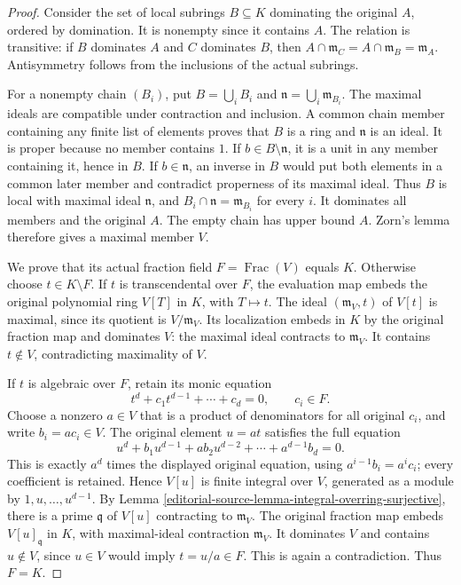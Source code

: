 \begin{proof}
Consider the set of local subrings
$B\subseteq K$ dominating the
original $A$, ordered by domination.
It is nonempty since it contains
$A$. The relation is transitive:
if $B$ dominates $A$ and $C$
dominates $B$, then
$A\cap\mathfrak m_C=A\cap\mathfrak m_B=\mathfrak m_A$.
Antisymmetry follows from the
inclusions of the actual subrings.

For a nonempty chain $(B_i)$,
put $B=\bigcup_i B_i$ and
$\mathfrak n=\bigcup_i\mathfrak m_{B_i}$.
The maximal ideals are compatible
under contraction and inclusion.
A common chain member containing
any finite list of elements proves
that $B$ is a ring and
$\mathfrak n$ is an ideal.
It is proper because no member
contains $1$. If $b\in B\setminus\mathfrak n$,
it is a unit in any member
containing it, hence in $B$.
If $b\in\mathfrak n$, an inverse
in $B$ would put both elements
in a common later member and
contradict properness of its
maximal ideal. Thus $B$ is
local with maximal ideal
$\mathfrak n$, and
$B_i\cap\mathfrak n=\mathfrak m_{B_i}$
for every $i$. It dominates
all members and the original
$A$. The empty chain has
upper bound $A$. Zorn's lemma
therefore gives a maximal
member $V$.

We prove that its actual
fraction field $F=\operatorname{Frac}(V)$
equals $K$. Otherwise choose
$t\in K\setminus F$.
If $t$ is transcendental over
$F$, the evaluation map embeds
the original polynomial ring
$V[T]$ in $K$, with $T\mapsto t$.
The ideal $(\mathfrak m_V,t)$
of $V[t]$ is maximal, since
its quotient is $V/\mathfrak m_V$.
Its localization embeds in
$K$ by the original fraction
map and dominates $V$:
the maximal ideal contracts
to $\mathfrak m_V$. It contains
$t\notin V$, contradicting
maximality of $V$.

If $t$ is algebraic over
$F$, retain its monic equation
$$
t^d+c_1t^{d-1}+\cdots+c_d=0,
\qquad c_i\in F.
$$
Choose a nonzero $a\in V$
that is a product of denominators
for all original $c_i$, and
write $b_i=ac_i\in V$.
The original element $u=at$
satisfies the full equation
$$
u^d+b_1u^{d-1}+a b_2u^{d-2}
+\cdots+a^{d-1}b_d=0.
$$
This is exactly $a^d$ times
the displayed original equation,
using $a^{i-1}b_i=a^ic_i$;
every coefficient is retained.
Hence $V[u]$ is finite integral
over $V$, generated as a module
by $1,u,\ldots,u^{d-1}$.
By Lemma
\ref{editorial-source-lemma-integral-overring-surjective},
there is a prime $\mathfrak q$
of $V[u]$ contracting to
$\mathfrak m_V$. The original
fraction map embeds $V[u]_{\mathfrak q}$
in $K$, with maximal-ideal
contraction $\mathfrak m_V$.
It dominates $V$ and contains
$u\notin V$, since $u\in V$
would imply $t=u/a\in F$.
This is again a contradiction.
Thus $F=K$.


\end{proof}
